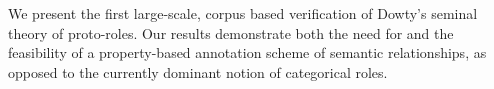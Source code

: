 We present the first large-scale, corpus based verification of Dowty's seminal theory of proto-roles. Our results demonstrate both the need for and the feasibility of a property-based annotation scheme of semantic relationships, as opposed to the currently dominant notion of categorical roles.
